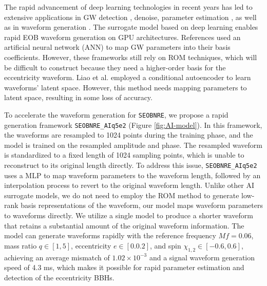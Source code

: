 \documentclass[
reprint,
superscriptaddress,
amsmath,amssymb,
aps,
prd,
floatfix,
]{revtex4-2}
\begin{document}
The rapid advancement of deep learning technologies in recent years has  led to extensive applications \cite{zhaoDawningNewEra2023} in GW detection \cite{georgeDeepLearningRealtime2018, georgeDeepNeuralNetworks2018,gabbardMatchingMatchedFiltering2018, zhaoDilatedConvolutionalNeural2024}, denoise\cite{wangWaveFormerTransformerbasedDenoising2024, zhaoSpacebasedGravitationalWave2023}, parameter estimation \cite{greenCompleteParameterInference2021a,daxRealTimeGravitationalWave2021, wangSamplingPriorKnowledge2022}, as well as in waveform generation \cite{chuaReducedorderModelingArtificial2019, khanGravitationalwaveSurrogateModels2021, nousiAutoencoderdrivenSpiralRepresentation2022, thomasAcceleratingMultimodalGravitational2022, fragkouliDeepResidualError2023,liaoDeepGenerativeModels2021, leeDeepLearningModel2021, khanInterpretableAIForecasting2022, shiCompactBinarySystems2024, yanModelingTimeEvolution2024a}. 
The surrogate model based on deep learning enables rapid EOB waveform generation on GPU architectures.
References \cite{chuaReducedorderModelingArtificial2019,khanGravitationalwaveSurrogateModels2021,nousiAutoencoderdrivenSpiralRepresentation2022, thomasAcceleratingMultimodalGravitational2022, fragkouliDeepResidualError2023} used an artificial neural network (ANN) to map GW parameters into their basis coefficients. 
However, these frameworks still rely on ROM techniques, which will be difficult to construct because they need a higher-order basis for the eccentricity waveform. 
Liao et al. \cite{liaoDeepGenerativeModels2021} employed a conditional autoencoder to learn waveforms' latent space. However, this method needs mapping parameters to latent space, resulting in some loss of accuracy. 


To accelerate the waveform generation for \texttt{SEOBNRE}, we propose a rapid generation framework \texttt{SEOBNRE\_AIq5e2} (Figure \ref{fig:AI-model}). 
In this framework, the waveforms are resampled to 1024 points during the training phase, and the model is trained on the resampled amplitude and phase. 
The resampled waveform is standardized to a fixed length of 1024 sampling points, which is unable to reconstruct to its original length directly. 
To address this issue, \texttt{SEOBNRE\_AIq5e2} uses a MLP to map waveform parameters to the waveform length, followed by an interpolation process to revert to the original waveform length.
Unlike other AI surrogate models, we do not need to employ the ROM method to generate low-rank basis representations of the waveform, our model maps waveform parameters to waveforms directly.
We utilize a single model to produce a shorter waveform that retains a substantial amount of the original waveform information.
The model can generate waveforms rapidly with the reference frequency $Mf=0.06$, mass ratio $q\in[1,5]$, eccentricity $e\in[0.0.2]$, and spin $\chi_{1,2}\in[-0.6,0.6]$, achieving an average mismatch of $1.02\times 10^{-3}$ and a signal waveform generation speed of 4.3 ms, 
which makes it possible for rapid parameter estimation and detection of the eccentricity BBHs.
\end{document}
